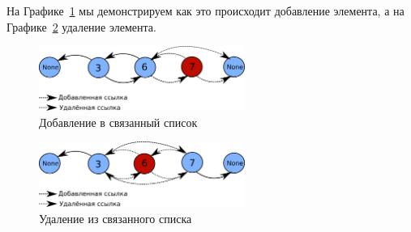 На Графике~\ref{fig:linked_list_addition} мы демонстрируем как это происходит 
добавление элемента, а на Графике~\ref{fig:linked_list_deletion} удаление элемента. 

\begin{figure}
\centering
\includegraphics[width=0.6\textwidth]{graphics/linked_list_addition}
\caption{Добавление в связанный список}
\label{fig:linked_list_addition}
\end{figure}

\begin{figure}
\centering
\includegraphics[width=0.6\textwidth]{graphics/linked_list_deletion}
\caption{Удаление из связанного списка}
\label{fig:linked_list_deletion}
\end{figure}

